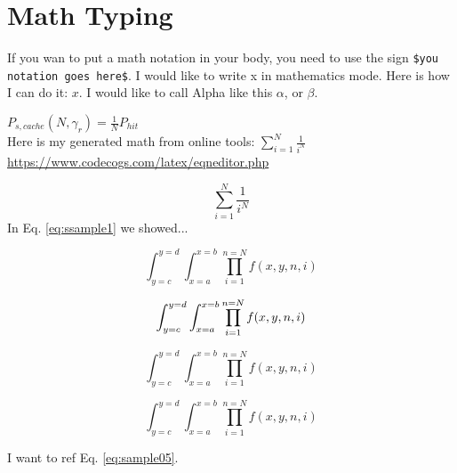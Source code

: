 \section{Math Typing}
\label{sec:math}

If you wan to put a math notation in your body, you need to use the sign \verb|$you notation goes here$|. I would like to write x in mathematics mode. Here is how I can do it: $x$.
I would like to call Alpha like this $\alpha$, or $\beta$.

$P_{s, cache} (N, \gamma_r) =\frac{1}{N} P_{hit}$\\
Here is my generated math from online tools: $\sum_{i=1}^{N}\frac{1}{i^{N}}$\\
\url{https://www.codecogs.com/latex/eqneditor.php}

\begin{equation}
\label{eq:ssample1}
\sum_{i=1}^{N}\frac{1}{i^{N}}
\end{equation}
In Eq. \ref{eq:ssample1} we showed...

\begin{equation}
\label{eq:sample02}
\int_{y=c}^{y=d} \int_{x=a}^{x=b} \prod_{i=1}^{n=N} f(x,y,n,i)
\end{equation}

\begin{equation}
\label{eq:sample03}
\int_{y=c}^{y=d} \int_{x=a}^{x=b} \prod_{i=1}^{n=N} f(x,y,n,i)
\notag
\end{equation}

\begin{equation}
\label{eq:sample04}
\int_{y=c}^{y=d} \int_{x=a}^{x=b} \prod_{i=1}^{n=N} f(x,y,n,i)
\nonumber
\end{equation}

\begin{equation}
\label{eq:sample05}
\int_{y=c}^{y=d} \int_{x=a}^{x=b} \prod_{i=1}^{n=N} f(x,y,n,i)
\end{equation}

I want to ref Eq. \ref{eq:sample05}.